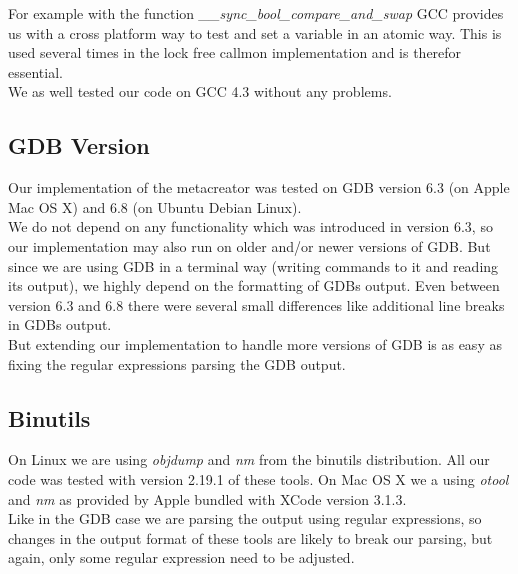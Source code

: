 For example with the function \emph{\_\_sync\_bool\_compare\_and\_swap} GCC provides us with a cross platform way to test and set a variable in an atomic way. This is used several times in the lock free callmon implementation and is therefor essential.\\

We as well tested our code on GCC 4.3 without any problems.

\subsection{GDB Version} Our implementation of the metacreator was tested on GDB version 6.3 (on Apple Mac OS X) and 6.8 (on Ubuntu Debian Linux).\\

We do not depend on any functionality which was introduced in version 6.3, so our implementation may also run on older and/or newer versions of GDB. But since we are using GDB in a terminal way (writing commands to it and reading its output), we highly depend on the formatting of GDBs output. Even between version 6.3 and 6.8 there were several small differences like additional line breaks in GDBs output.\\

But extending our implementation to handle more versions of GDB is as easy as fixing the regular expressions parsing the GDB output.

\subsection{Binutils} On Linux we are using \emph{objdump} and \emph{nm} from the binutils distribution. All our code was tested with version 2.19.1 of these tools. On Mac OS X we a using \emph{otool} and \emph{nm} as provided by Apple bundled with XCode version 3.1.3.\\

Like in the GDB case we are parsing the output using regular expressions, so changes in the output format of these tools are likely to break our parsing, but again, only some regular expression need to be adjusted.
